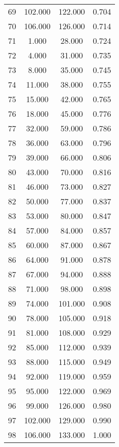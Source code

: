 \begin{tabular}{cccc}
  69 & 102.000 & 122.000 & 0.704 \\ 
  70 & 106.000 & 126.000 & 0.714 \\ 
  71 & 1.000 & 28.000 & 0.724 \\ 
  72 & 4.000 & 31.000 & 0.735 \\ 
  73 & 8.000 & 35.000 & 0.745 \\ 
  74 & 11.000 & 38.000 & 0.755 \\ 
  75 & 15.000 & 42.000 & 0.765 \\ 
  76 & 18.000 & 45.000 & 0.776 \\ 
  77 & 32.000 & 59.000 & 0.786 \\ 
  78 & 36.000 & 63.000 & 0.796 \\ 
  79 & 39.000 & 66.000 & 0.806 \\ 
  80 & 43.000 & 70.000 & 0.816 \\ 
  81 & 46.000 & 73.000 & 0.827 \\ 
  82 & 50.000 & 77.000 & 0.837 \\ 
  83 & 53.000 & 80.000 & 0.847 \\ 
  84 & 57.000 & 84.000 & 0.857 \\ 
  85 & 60.000 & 87.000 & 0.867 \\ 
  86 & 64.000 & 91.000 & 0.878 \\ 
  87 & 67.000 & 94.000 & 0.888 \\ 
  88 & 71.000 & 98.000 & 0.898 \\ 
  89 & 74.000 & 101.000 & 0.908 \\ 
  90 & 78.000 & 105.000 & 0.918 \\ 
  91 & 81.000 & 108.000 & 0.929 \\ 
  92 & 85.000 & 112.000 & 0.939 \\ 
  93 & 88.000 & 115.000 & 0.949 \\ 
  94 & 92.000 & 119.000 & 0.959 \\ 
  95 & 95.000 & 122.000 & 0.969 \\ 
  96 & 99.000 & 126.000 & 0.980 \\ 
  97 & 102.000 & 129.000 & 0.990 \\ 
  98 & 106.000 & 133.000 & 1.000 \\ 
   \hline
\end{tabular}
